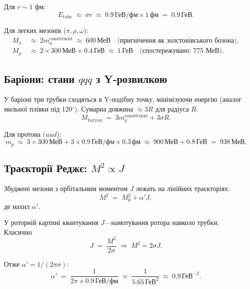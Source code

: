 \documentclass[11pt,a4paper]{article}
\theoremstyle{definition}
\theoremstyle{plain}
\theoremstyle{remark}
\begin{document}
Для $r\sim 1$ фм:
\begin{equation}
E_{\mathrm{tube}} \;\approx\; \sigma r \;\approx\; 0{.}9\,\text{ГеВ/фм}\times 1\,\text{фм} \;=\; 0{.}9\,\text{ГеВ}.
\end{equation}

Для легких мезонів ($\pi,\rho,\omega$):
\begin{align}
M_\pi &\;\approx\; 2m_u^{\mathrm{constituent}} \;\approx\; 600\,\text{МеВ} \quad\text{(пригнічення як золстонівського бозона)}, \\
M_\rho &\;\approx\; 2\times 300\,\text{МеВ} + 0{.}4\,\text{ГеВ} \;\approx\; 1\,\text{ГеВ} \quad\text{(спостережувано: 775 МеВ)}.
\end{align}

\subsection{Баріони: стани $qqq$ з Y-розвилкою}

У баріоні три трубки сходяться в Y-подібну точку, мінімізуючи енергію (аналог мильної плівки під 120$^\circ$). Сумарна довжина $\approx 3R$ для радіуса $R$:
\begin{equation}
M_{\mathrm{baryon}} \;=\; 3m_q^{\mathrm{constituent}} + 3\sigma R.
\end{equation}

Для протона ($uud$):
\begin{equation}
m_p \;\approx\; 3\times 300\,\text{МеВ} + 3\times 0{.}9\,\text{ГеВ/фм}\times 0{.}3\,\text{фм} \;\approx\; 900\,\text{МеВ} + 0{.}8\,\text{ГеВ} \;=\; \boxed{938\,\text{МеВ}.}
\end{equation}

\subsection{Траєкторії Реджє: $M^2 \propto J$}

Збуджені мезони з орбітальним моментом $J$ лежать на лінійних траєкторіях:
\begin{equation}
M^2 \;=\; M_0^2 + \alpha' J,
\label{eq:regge-trajectory}
\end{equation}
де нахил $\alpha'$.

У роторній картині квантування $J$—намотування ротора навколо трубки. Класично
\begin{equation}
J \;=\; \frac{M^2}{2\sigma} \;\Rightarrow\; M^2=2\sigma J.
\end{equation}

Отже $\alpha'=1/(2\pi\sigma)$:
\begin{equation}
\alpha' \;=\; \frac{1}{2\pi \times 0{.}9\,\text{ГеВ/фм}} \;\approx\; \frac{1}{5{.}65\,\text{ГеВ}^2} \;\approx\; \boxed{0{.}9\,\text{ГеВ}^{-2}.}
\label{eq:regge-slope}
\end{equation}
\end{document}
